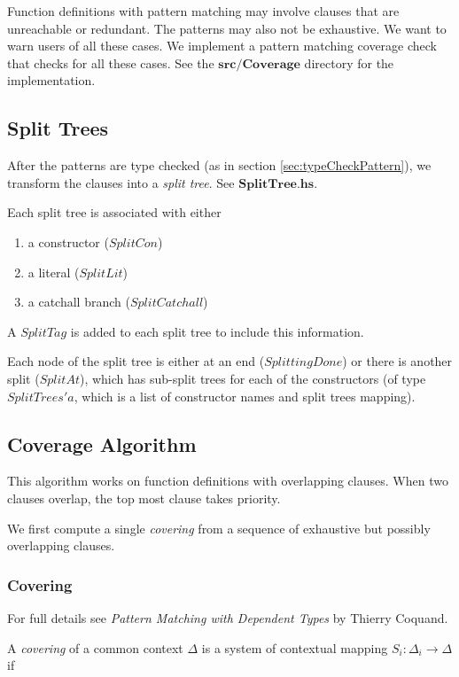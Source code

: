 Function definitions with pattern matching may involve clauses that are unreachable or redundant. The patterns may also not be exhaustive. We want to warn users of all these cases. We implement a pattern matching coverage check that checks for all these cases. See the $\boldsymbol{src/Coverage}$ directory for the implementation.

\subsection{Split Trees}

After the patterns are type checked (as in section \ref{sec:typeCheckPattern}), we transform the clauses into a \textit{split tree}. See $\boldsymbol{SplitTree.hs}$.

Each split tree is associated with either 

\begin{enumerate}
  \item a constructor ($SplitCon$)
  \item a literal ($SplitLit$)
  \item a catchall branch ($SplitCatchall$)
\end{enumerate}

A $SplitTag$ is added to each split tree to include this information. 

Each node of the split tree is either at an end ($SplittingDone$) or there is another split ($SplitAt$), which has sub-split trees for each of the constructors (of type $SplitTrees' a$, which is a list of constructor names and split trees mapping).

\subsection{Coverage Algorithm}

This algorithm works on function definitions with overlapping clauses. When two clauses overlap, the top most clause takes priority.

We first compute a single \textit{covering} from a sequence of exhaustive but possibly overlapping clauses.

\subsubsection{Covering}

For full details see \textit{Pattern Matching with Dependent Types} by Thierry Coquand.

A \textit{covering} of a common context $\Delta$ is a system of contextual mapping $S_i : \Delta_i \to \Delta$ if

